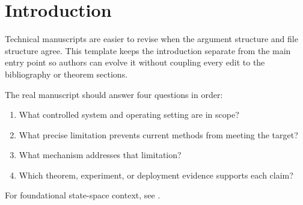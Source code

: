 \section{Introduction}

Technical manuscripts are easier to revise when the argument structure and file structure agree. This template keeps the introduction separate from the main entry point so authors can evolve it without coupling every edit to the bibliography or theorem sections.

The real manuscript should answer four questions in order:
\begin{enumerate}
  \item What controlled system and operating setting are in scope?
  \item What precise limitation prevents current methods from meeting the target?
  \item What mechanism addresses that limitation?
  \item Which theorem, experiment, or deployment evidence supports each claim?
\end{enumerate}

For foundational state-space context, see \cite{kalman1960}.
